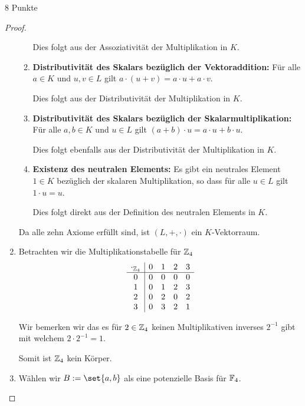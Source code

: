 \documentclass{problemset}
\begin{document}
\begin{problem}{8 Punkte}
\begin{proof}
\begin{enumerate}
\begin{enumerate}
                        Dies folgt aus der Assoziativität der Multiplikation in $K$.

                  \item \textbf{Distributivität des Skalars bezüglich der Vektoraddition:} Für alle $a \in K$ und $u, v \in L$ gilt $a \cdot (u + v) = a \cdot u + a \cdot v$.

                        Dies folgt aus der Distributivität der Multiplikation in $K$.

                  \item \textbf{Distributivität des Skalars bezüglich der Skalarmultiplikation:} Für alle $a, b \in K$ und $u \in L$ gilt $(a + b) \cdot u = a \cdot u + b \cdot u$.

                        Dies folgt ebenfalls aus der Distributivität der Multiplikation in $K$.

                  \item \textbf{Existenz des neutralen Elements:} Es gibt ein neutrales Element $1 \in K$ bezüglich der skalaren Multiplikation, so dass für alle $u \in L$ gilt $1 \cdot u = u$.

                        Dies folgt direkt aus der Definition des neutralen Elements in $K$.
              \end{enumerate}

              Da alle zehn Axiome erfüllt sind, ist $(L, +, \cdot)$ ein $K$-Vektorraum.

        \item Betrachten wir die Multiplikationstabelle für $\mathbb{Z}_4$
              \[
                  \begin{array}{c|cccc}
                      \cdot_{\mathbb{Z}_4} & 0 & 1 & 2 & 3 \\
                      \hline
                      0                   & 0 & 0 & 0 & 0 \\
                      1                   & 0 & 1 & 2 & 3 \\
                      2                   & 0 & 2 & 0 & 2 \\
                      3                   & 0 & 3 & 2 & 1 \\
                  \end{array}
              \]

              Wir bemerken wir das es für $2 \in \mathbb{Z}_4$ keinen Multiplikativen inverses
              $2^{-1}$ gibt mit welchem $2 \cdot 2^{-1} = 1$.

              Somit ist $\mathbb{Z}_4$ kein Körper. \checkmark
        \item Wählen wir $B := \set{a, b}$ als eine potenzielle Basis für $\mathbb{F}_4$.


\end{enumerate}
\end{proof}
\end{problem}
\end{document}
